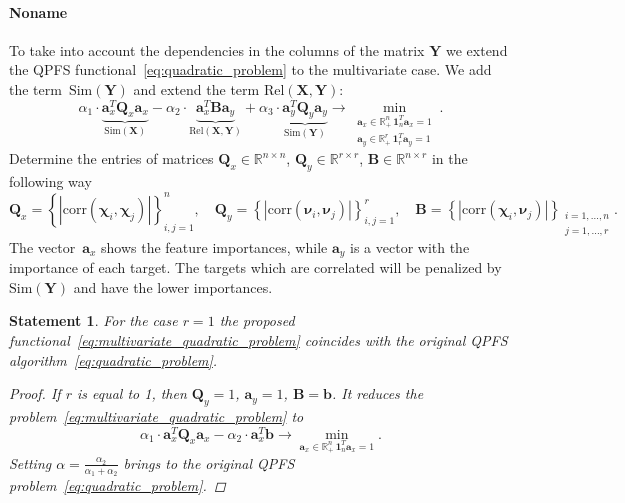 \documentclass[12pt,twoside]{article}
\newtheorem{statement}{Statement}
\newcommand{\ba}{\mathbf{a}}
\newcommand{\bb}{\mathbf{b}}
\newcommand{\bY}{\mathbf{Y}}
\newcommand{\bX}{\mathbf{X}}
\newcommand{\bB}{\mathbf{B}}
\newcommand{\bQ}{\mathbf{Q}}
\newcommand{\bbR}{\mathbb{R}}
\newcommand{\bchi}{\boldsymbol{\chi}}
\newcommand{\bnu}{\boldsymbol{\nu}}
\newcommand{\bOne}{\boldsymbol{1}}
\begin{document}
\paragraph{Noname}

To take into account the dependencies in the columns of the matrix $\bY$ we extend the QPFS functional~\eqref{eq:quadratic_problem} to the multivariate case. 
We add the term~$\text{Sim}(\bY)$ and extend the term $\text{Rel}(\bX, \bY)$:
\begin{equation}
	\alpha_1 \cdot \underbrace{\ba_x^T \bQ_x \ba_x}_{\text{Sim}(\bX)} - \alpha_2 \cdot \underbrace{\ba_x^T \bB \ba_y}_{\text{Rel}(\bX, \bY)} + \alpha_3 \cdot \underbrace{\ba_y^T \bQ_y \ba_y}_{\text{Sim}(\bY)} \rightarrow \min_{\substack{\ba_x \in \bbR^n_+ \, \bOne_n^T\ba_x=1 \\ \ba_y \in \bbR^r _+ \, \bOne_r^T\ba_y=1}}.
	\label{eq:multivariate_quadratic_problem}
\end{equation}
Determine the entries of matrices $\bQ_x \in \bbR^{n \times n}$, $\bQ_y \in \bbR^{r \times r}$, $\bB \in \bbR^{n \times r}$ in the following way
\begin{equation*}
	\bQ_x = \left\{ \left| \text{corr}(\bchi_i, \bchi_j) \right| \right\}_{i,j=1}^n, \quad 
	\bQ_y = \left\{ \left| \text{corr}(\bnu_i, \bnu_j) \right| \right\}_{i,j=1}^r, \quad
	\bB =  \left\{ \left| \text{corr}(\bchi_i, \bnu_j) \right| \right\}_{\substack{i=1, \dots, n \\ j=1, \dots, r}}.
\end{equation*}
The vector~$\ba_x$ shows the feature importances, while $\ba_y$ is a vector with the importance of each target. 
The targets which are correlated will be penalized by $\text{Sim} (\bY)$ and have the lower importances.  

\begin{statement}
For the case $r=1$ the proposed functional~\eqref{eq:multivariate_quadratic_problem} coincides with the original QPFS algorithm~\eqref{eq:quadratic_problem}.

\begin{proof}
	If $r$ is equal to 1, then $\bQ_y = 1$, $\ba_y = 1$, $\bB = \bb$. It reduces the problem~\eqref{eq:multivariate_quadratic_problem} to 
	\[
	\alpha_1 \cdot \ba_x^T \bQ_x \ba_x - \alpha_2 \cdot \ba_x^T \bb \rightarrow \min_{\ba_x \in \bbR^n_+ \, \bOne_n^T\ba_x=1} .
	\]
	Setting $\alpha = \frac{\alpha_2}{\alpha_1 + \alpha_2}$ brings to the original QPFS problem~\eqref{eq:quadratic_problem}.
\end{proof}
\end{statement}
\end{document}
